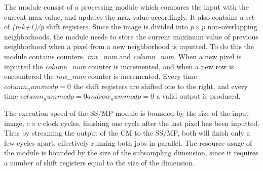 The module consist of a processing module which compares the input with the current max value, and updates the max value accordingly. It also contains a set of \textit{(n-k+1)/p} shift registers. Since the image is divided into $ p \times p $ non-overlapping neighborhoods, the module needs to store the current maximum value of previous neighborhood when a pixel from a new neighborhood is inputted. To do this the module contains counters, \textit{row\_num} and \textit{column\_num}. When a new pixel is inputted the \textit{column\_num} counter is incremented, and when a new row is encountered the \textit{row\_num} counter is incremented. Every time $ column_num mod p = 0 $ the shift registers are shifted one to the right, and every time $ column_num mod p = 0 and row_num mod p = 0 $ a valid output is produced. 

The execution speed of the SS/MP module is bounded by the size of the input image, $ c \times c $ clock cycles, finishing one cycle after the last pixel has been inputted. 
Thus by streaming the output of the CM to the SS/MP, both will finish only a few cycles apart, effectively running both jobs in parallel. The resource usage of the module is bounded by the size of the subsampling dimension, since it requires a number of shift registers equal to the size of the dimension. 